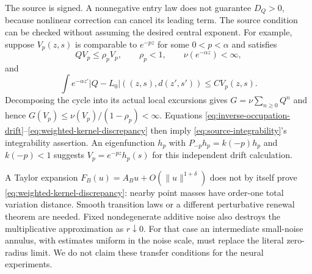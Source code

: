 The source is signed. A nonnegative entry law does not guarantee
$D_Q>0$, because nonlinear correction can cancel its leading term.
The source condition can be checked without assuming the desired
central exponent. For example, suppose $V_p(z,s)$ is comparable to
$e^{-pz}$ for some $0<p<\alpha$ and satisfies
\begin{equation}
 QV_p\le\rho_p V_p,\qquad \rho_p<1,
 \qquad \nu(e^{-\alpha z})<\infty,
 \label{eq:inverse-occupation-drift}
\end{equation}
and
\begin{equation}
 \int e^{-\alpha z'}
 |Q-L_0|((z,s),d(z',s'))\le C V_p(z,s).
 \label{eq:weighted-kernel-discrepancy}
\end{equation}
Decomposing the cycle into its actual local excursions gives
$G=\nu\sum_{n\ge0}Q^n$ and hence
$G(V_p)\le\nu(V_p)/(1-\rho_p)<\infty$.
Equations \eqref{eq:inverse-occupation-drift}--\eqref{eq:weighted-kernel-discrepancy}
then imply \eqref{eq:source-integrability}'s integrability assertion.
An eigenfunction $h_p$ with $P_{-p}h_p=k(-p)h_p$ and $k(-p)<1$
suggests $V_p=e^{-pz}h_p(s)$ for this independent drift calculation.

A Taylor expansion $F_B(u)=A_Bu+O(\|u\|^{1+\delta})$ does not by
itself prove \eqref{eq:weighted-kernel-discrepancy}: nearby point masses
have order-one total variation distance. Smooth transition laws or a
different perturbative renewal theorem are needed. Fixed nondegenerate
additive noise also destroys the multiplicative approximation as
$r\downarrow0$. For that case an intermediate small-noise annulus,
with estimates uniform in the noise scale, must replace the literal
zero-radius limit. We do not claim these transfer conditions for the
neural experiments.
